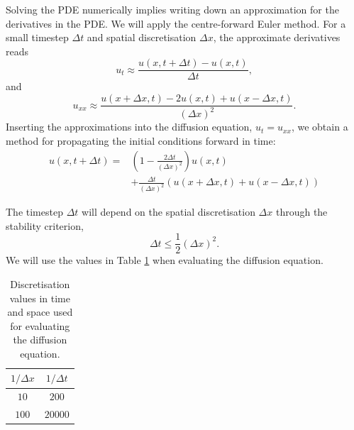 \documentclass[a4paper, 
amsfonts, 
amssymb, 
amsmath, 
reprint, 
showkeys, 
nofootinbib, 
twoside]{revtex4-2}
\begin{document}
Solving the PDE numerically implies writing down an approximation for the derivatives in the PDE. We will apply the centre-forward Euler method. For a small timestep $\Delta t$ and spatial discretisation $\Delta x$, the approximate derivatives reads
\begin{equation}
    u_t \approx \frac{u(x, t + \Delta t) - u(x, t)}{\Delta t},
\end{equation}
and
\begin{equation}
    u_{xx} \approx \frac{u(x + \Delta x, t) - 2 u(x, t) + u(x - \Delta x, t)}{(\Delta x)^2}.
\end{equation}
Inserting the approximations into the diffusion equation, $u_t = u_{xx}$, we obtain a method for propagating the initial conditions forward in time:
\begin{align*}
    u(x, t + \Delta t) = &\left(1 - \frac{2 \Delta t}{(\Delta x)^2}\right) u(x, t) \\
    &+ \frac{\Delta t}{(\Delta x)^2} \left( u(x + \Delta x, t) + u(x - \Delta x, t) \right)
\end{align*}

The timestep $\Delta t$ will depend on the spatial discretisation $\Delta x$ through the stability criterion,
\begin{equation}
    \Delta t \leq \frac{1}{2}(\Delta x)^2.
\end{equation}
We will use the values in Table \ref{tab:disc} when evaluating the diffusion equation.

\begin{table}[h!]
\caption{Discretisation values in time and space used for evaluating the diffusion equation.}
\begin{tabular}{@{}cc@{}}
\toprule
$1 / \Delta x$ & $1 / \Delta t $\\ \midrule
${10}$  & ${200}$  \\
${100}$  &  ${20000}$ \\ \bottomrule
\end{tabular}
\label{tab:disc}
\end{table}
\end{document}
